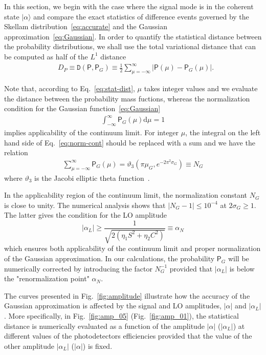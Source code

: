 \documentclass[%
reprint,
superscriptaddress,
 amsmath,amssymb,amsfonts,
 aps,
 pra,
 longbibliography
]{revtex4-2}
\newcommand{\ket}[1]{\ensuremath{|{#1}\rangle}}
\newcommand{\prob}{\mathsf{P}}
\newcommand{\dd}{\mathrm{d}}
\begin{document}
In this section, we
begin with the case where the signal mode is in the coherent state
$\ket{\alpha}$ and
compare the exact statistics of difference events
governed by the Skellam distribution~\eqref{eq:accurate}
and the Gaussian approximation~\eqref{eq:Gaussian}.
In order to quantify the statistical distance between the probability distributions,
we shall use
the total variational distance
that can be computed as half of  the $L^1$ distance
\begin{align}
  &
    \label{eq:stat-dist}
    D_P\equiv\mathtt{D}\left(\prob,\prob_{G}\right)\equiv
    \frac{1}{2}
    \sum_{\mu=-\infty}^{\infty}
    \lvert\prob(\mu) -\prob_G(\mu)\rvert.
  \end{align}

  Note that, according to Eq.~\eqref{eq:stat-dist},
  $\mu$ takes integer values and
  we evaluate the distance between the probability mass fuctions,
  whereas the normalization condition for
the Gaussian function~\eqref{eq:Gaussian}
\begin{align}
    \label{eq:norm-cont}
  \int_{-\infty}^{\infty}
    \prob_G(\mu)
  \dd\mu
    =1
\end{align}
implies applicability of the continuum limit.
For integer $\mu$,
the integral
on the left hand side of Eq.~\eqref{eq:norm-cont}
should be replaced with a sum
and we have the relation
\begin{align}
  \label{eq:discr-norm}
  \sum_{\mu=-\infty}^{\infty} \prob_G(\mu)=\vartheta_3(\pi\mu_G,e^{-2\pi^2\sigma_G})\equiv N_G
\end{align}
where $\vartheta_3$ is the Jacobi elliptic theta function~\cite{NIST:hndbk:2010}.

In the applicability region of
the continuum limit, the normalization constant $N_G$
is close to unity. The numerical analysis shows that
$|N_G-1|\le 10^{-4}$ at $ 2\sigma_{G}\ge 1$.
The latter gives the condition for the LO amplitude
\begin{equation}
    |\alpha_L|\geq \frac{1}{\sqrt{2(\eta_1S^2+\eta_2C^2)}}\equiv\alpha_N
    \label{eq:renorm}
  \end{equation}
   which ensures both applicability of the continuum limit
  and proper normalization of the Gaussian approximation.
  In our calculations,
the probability $\prob_G$ will be numerically corrected by introducing
the factor $N_G^{-1}$
provided that $|\alpha_L|$ is below the "renormalization point" $\alpha_N$.


  The curves presented in Fig.~\ref{fig:amplitude}
  illustrate how the accuracy of the Gaussian approximation
  is affected by the signal and LO amplitudes, $|\alpha|$ and $|\alpha_L|$.
  More specifically, in
Fig.~\ref{fig:amp_05} (Fig.~\ref{fig:amp_01}),
  the statistical distance is numerically evaluated as a function
  of the amplitude $|\alpha|$ ($|\alpha_L|$)
at different values of the photodetectors efficiencies
provided that the value of
the other amplitude $|\alpha_L|$ ($|\alpha|$) is fixed.
\end{document}
